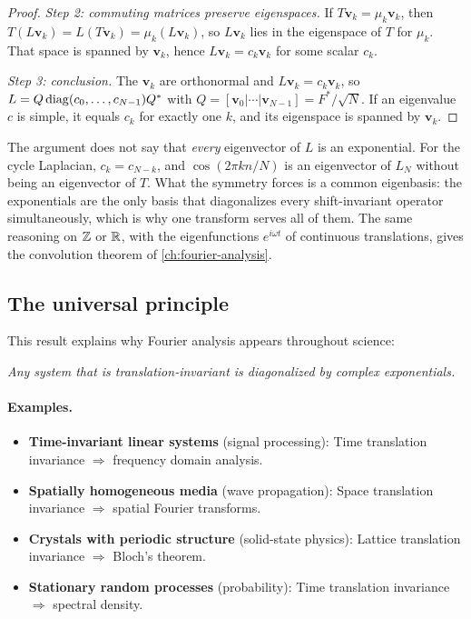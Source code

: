 \begin{notechapter}
\begin{proof}
\emph{Step 2: commuting matrices preserve eigenspaces.} If $T\mathbf{v}_k = \mu_k\mathbf{v}_k$, then $T(L\mathbf{v}_k) = L(T\mathbf{v}_k) = \mu_k(L\mathbf{v}_k)$, so $L\mathbf{v}_k$ lies in the eigenspace of $T$ for $\mu_k$. That space is spanned by $\mathbf{v}_k$, hence $L\mathbf{v}_k = c_k\mathbf{v}_k$ for some scalar $c_k$.

\emph{Step 3: conclusion.} The $\mathbf{v}_k$ are orthonormal and $L\mathbf{v}_k = c_k\mathbf{v}_k$, so $L = Q\operatorname{diag}(c_0,\ldots,c_{N-1})Q^*$ with $Q = [\mathbf{v}_0|\cdots|\mathbf{v}_{N-1}] = F^*/\sqrt N$. If an eigenvalue $c$ is simple, it equals $c_k$ for exactly one $k$, and its eigenspace is spanned by $\mathbf{v}_k$.
\end{proof}

\begin{remark}
The argument does not say that \emph{every} eigenvector of $L$ is an exponential. For the cycle Laplacian, $c_k = c_{N-k}$, and $\cos(2\pi kn/N)$ is an eigenvector of $L_N$ without being an eigenvector of $T$. What the symmetry forces is a common eigenbasis: the exponentials are the only basis that diagonalizes every shift-invariant operator simultaneously, which is why one transform serves all of them. The same reasoning on $\mathbb{Z}$ or $\mathbb{R}$, with the eigenfunctions $e^{i\omega t}$ of continuous translations, gives the convolution theorem of \cref{ch:fourier-analysis}.
\end{remark}

\subsection{The universal principle}

This result explains why Fourier analysis appears throughout science:

\begin{keyidea}
\emph{Any system that is translation-invariant is diagonalized by
complex exponentials.}
\end{keyidea}

\paragraph{Examples.}
\begin{itemize}
\item \textbf{Time-invariant linear systems} (signal processing):
      Time translation invariance $\Rightarrow$ frequency domain analysis.
\item \textbf{Spatially homogeneous media} (wave propagation):
      Space translation invariance $\Rightarrow$ spatial Fourier transforms.
\item \textbf{Crystals with periodic structure} (solid-state physics):
      Lattice translation invariance $\Rightarrow$ Bloch's theorem.
\item \textbf{Stationary random processes} (probability):
      Time translation invariance $\Rightarrow$ spectral density.
\end{itemize}


\end{notechapter}
